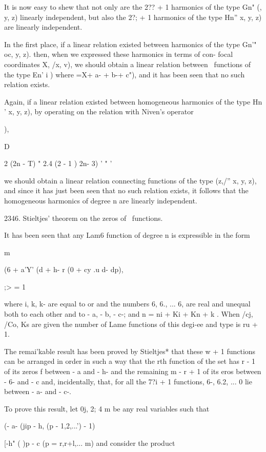{{{{{{{It is now easy to shew that not only are the 2?? + 1 harmonics of the
type Gn" (, y, z) linearly independent, but also the 2?; + 1
harmonics of the type Hn'' x, y, z) are linearly independent.

In the first place, if a linear relation existed between harmonics of
the type Gn'" oc, y, z). then, when we expressed these harmonics in
terms of con- focal coordinates X, /x, v), we should obtain a linear
relation between \Lame\ functions of the type En' i ) where =X+ a- + b-+
c"), and it has been seen that no such relation exists.

Again, if a linear relation existed between homogeneous harmonics of
the type Hn ' x, y, z), by operating on the relation with Niven's
operator

),

  D\

2 (2n - T) " 2.4 (2 - 1 ) 2n- 3) ' " '

we should obtain a linear relation connecting functions of the type
(z,/'' x, y, z), and since it has just been seen that no such relation
exists, it follows that the homogeneous harmonics of degree n are
linearly independent.

2346. Stieltjes' theorem on the zeros of \Lame\ functions.

It has been seen that any Lam6 function of degree n is expressible in
the form

m

(6 + a'Y' (d + h- r (0 + cy .u d- dp),

;> = 1

where i, k, k- are equal to or and the numbers 6, 6., ... 6, are
real and unequal both to each other and to - a, - b, - c-; and n =
ni + Ki + Kn + k . When /cj, /Co, Ks are given the number of Lame
functions of this degi-ee and type is ru + 1.

%
%

The remai'kable result has been proved by Stieltjes* that these w + 1
functions can be arranged in order in such a way that the rth function
of the set has r - 1 of its zeros f between - a and - h- and the
remaining m - r + 1 of its eros between - 6- and - c and,
incidentally, that, for all the 7?i + 1 functions, 6-, 6.2, ... 0 lie
between - a- and - c-.

To prove this result, let 0j, 2;  4 m be any real variables such
that

(- a- (jip - h, (p - 1,2,...') - 1)

[-h" ( )p - c (p = r,r+l,... m) and consider the product

}}}}}}}
